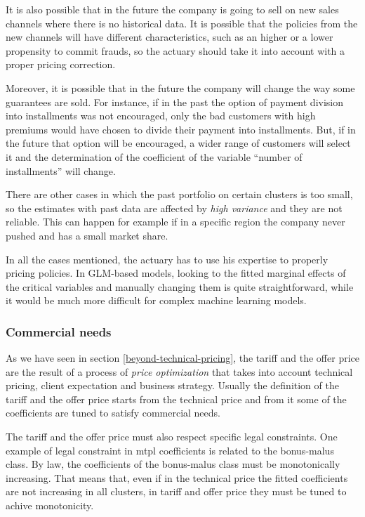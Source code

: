 \documentclass[a4paper, twoside, openright, 12pt]{report}
\theoremstyle{definition}
\theoremstyle{definition}
\theoremstyle{definition}
\theoremstyle{remark}
\begin{document}
It is also possible that in the future the company is going to sell on new sales channels where there is no historical data. It is possible that the policies from the new channels will have different characteristics, such as an higher or a lower propensity to commit frauds, so the actuary should take it into account with a proper pricing correction.

Moreover, it is possible that in the future the company will change the way some guarantees are sold. For instance, if in the past the option of payment division into installments was not encouraged, only the bad customers with high premiums would have chosen to divide their payment into installments. But, if in the future that option will be encouraged, a wider range of customers will select it and the determination of the coefficient of the variable ``number of installments'' will change.

There are other cases in which the past portfolio on certain clusters is too small, so the estimates with past data are affected by \emph{high variance} and they are not reliable. This can happen for example if in a specific region the company never pushed and has a small market share.

In all the cases mentioned, the actuary has to use his expertise to properly pricing policies. In GLM-based models, looking to the fitted marginal effects of the critical variables and manually changing them is quite straightforward, while it would be much more difficult for complex machine learning models.

\hypertarget{commercial-needs}{%
\subsubsection{Commercial needs}\label{commercial-needs}}

As we have seen in section \ref{beyond-technical-pricing}, the tariff and the offer price are the result of a process of \emph{price optimization} that takes into account technical pricing, client expectation and business strategy. Usually the definition of the tariff and the offer price starts from the technical price and from it some of the coefficients are tuned to satisfy commercial needs.

The tariff and the offer price must also respect specific legal constraints. One example of legal constraint in \ac{mtpl} coefficients is related to the bonus-malus class. By law, the coefficients of the bonus-malus class must be monotonically increasing. That means that, even if in the technical price the fitted coefficients are not increasing in all clusters, in tariff and offer price they must be tuned to achive monotonicity.
\end{document}
